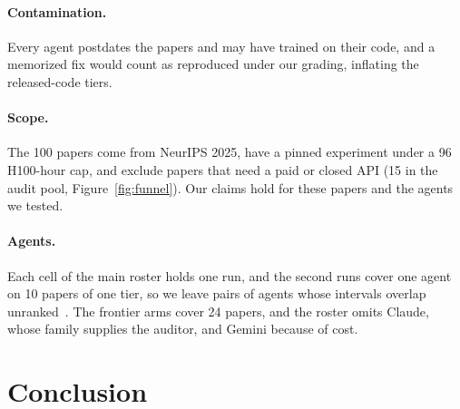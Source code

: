\documentclass{article} %
\newcommand{\todo}[1]{#1}%
\begin{document}
\paragraph{Contamination.} Every agent postdates the papers and may have
trained on their code, and a memorized fix would count as reproduced under our grading, inflating the released-code tiers.

\paragraph{Scope.} The 100 papers come from NeurIPS 2025, have a pinned experiment under a 96 H100-hour cap, and exclude papers that need a paid or closed API (15 in the audit pool, Figure~\ref{fig:funnel}). Our claims hold for these papers and the agents we tested.

\paragraph{Agents.} Each cell of the main roster holds one run, and the second
runs cover one agent on 10 papers of one tier, so we leave pairs of agents whose intervals
overlap unranked~\citep{bjarnason2026randomness}. The frontier arms cover
\todo{24} papers, and the roster omits Claude, whose family supplies the auditor, and Gemini because of cost.

\section{Conclusion}
\label{sec:conclusion}
\end{document}
